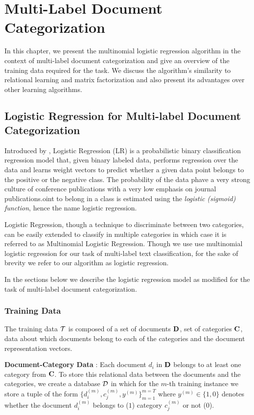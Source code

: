\chapter{Multi-Label Document Categorization}
\label{chapter:mltextcat}
In this chapter, we present the multinomial logistic regression algorithm in the context of multi-label document categorization and give an overview of the training data required for the task. We discuss the algorithm's similarity to relational learning and matrix factorization and also present its advantages over other learning algorithms.

\section{Logistic Regression for Multi-label Document Categorization}
\label{sec:lrtc}
Introduced by \citet{hosmer1989applied}, Logistic Regression (LR) is a probabilistic binary classification regression model that, given binary labeled data, performs regression over the data and learns weight vectors to predict whether a given data point belongs to the positive or the negative class. 
The probability of the data phave a very strong culture of conference 
publications with a very low emphasis on journal publications.oint to belong in a class is estimated using the \emph{logistic (sigmoid) function}, hence the name logistic regression.

Logistic Regression, though a technique to discriminate between two categories, can be easily extended to classify in multiple categories in which case it is referred to as Multinomial Logistic Regression. 
Though we use use multinomial logistic regression for our task of multi-label text classification, for the sake of brevity we refer to our algorithm as logistic regression.

In the sections below we describe the logistic regression model as modified for the task of multi-label document categorization.

\subsection{Training Data}
\label{sec:trdata_lr}
The training data $\mathcal{T}$ is composed of a set of documents $\mathbf{D}$, set of categories $\mathbf{C}$, data about which documents belong to each of the categories and the document representation vectors.

\textbf{Document-Category Data} : 
Each document $d_{i}$ in $\mathbf{D}$ belongs to at least one category from $\mathbf{C}$. To store this relational data between the documents and the categories, we create a database $\mathcal{D}$ in which for the $m$-th training instance we store a tuple of the form $\{ d^{(m)}_{i}, c^{(m)}_{j}, y^{(m)}\}^{m=T}_{m=1}$ where $y^{(m)} \in \{1, 0\}$ denotes whether the document $d^{(m)}_{i}$ belongs to ($1$) category $c^{(m)}_{j}$ or not ($0$). 

